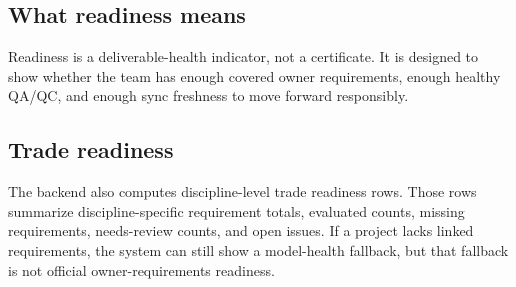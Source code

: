 \documentclass[10pt,letterpaper]{article}
\begin{document}
\subsection{What readiness means}

Readiness is a deliverable-health indicator, not a certificate. It is designed to show whether the team has enough covered owner requirements, enough healthy QA/QC, and enough sync freshness to move forward responsibly.

\begin{table}[!h]
\centering
\small
\caption{Readiness semantics}\label{tab:readiness-semantics}
\end{table}

\subsection{Trade readiness}

The backend also computes discipline-level trade readiness rows. Those rows summarize discipline-specific requirement totals, evaluated counts, missing requirements, needs-review counts, and open issues. If a project lacks linked requirements, the system can still show a model-health fallback, but that fallback is not official owner-requirements readiness.
\end{document}
